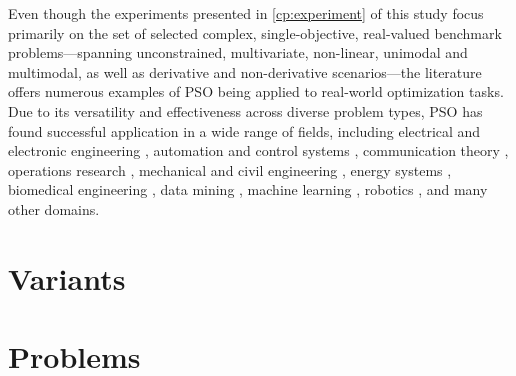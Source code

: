 {Even though the experiments presented in \autoref{cp:experiment} of this study focus primarily on the set of selected complex, single-objective, real-valued benchmark problems—spanning unconstrained, multivariate, non-linear, unimodal and multimodal, as well as derivative and non-derivative scenarios---the literature offers numerous examples of PSO being applied to real-world optimization tasks. Due to its versatility and effectiveness across diverse problem types, PSO has found successful application in a wide range of fields, including
electrical and electronic engineering \citep[e.g.,][]{jin2024improved, salvatierra2024pso, dibya2025optimized},
automation and control systems \citep[e.g.,][]{duan2024using,urgan2024pso,gil2024platooning}, 
communication theory \citep[e.g.,][]{qiao2025resource,jin2024overview,jin2025design}, 
operations research \citep[e.g.,][]{li2025ore,omran2025empirical,dong2022optimized, palaniappan2025task, simaiya2024hybrid}, 
mechanical and civil engineering \citep[e.g.,][]{ramkumar2025intelligent,wang2025optimisation,houssein2025recent}, 
energy systems \citep[e.g.,][]{bade2025multi,zhang2024energy,hamza2024optimization}, 
biomedical engineering \citep[e.g.,][]{mallik2024swarm}, 
data mining \citep[e.g.,][]{shan2024research,zuo2024knowledge,carstensen2025efficient}, 
machine learning \citep[e.g.,][]{alenezi2025hybrid,balavani2024enhanced,tijjani2024enhanced}, 
robotics \citep[e.g.,][]{sharma2025swarm,liu2025design,prakash2024swarm}, 
and many other domains. 





\section{Variants}





\section{Problems}



}
